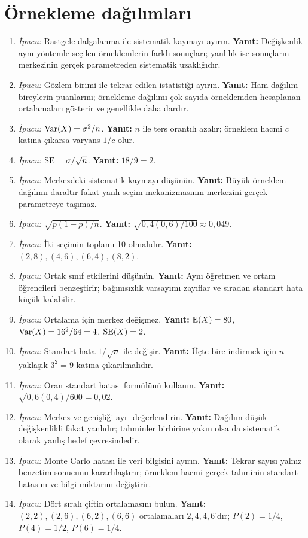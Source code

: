 \section{Örnekleme dağılımları}

\begin{enumerate}[leftmargin=*,itemsep=5pt]
\item \emph{İpucu:} Rastgele dalgalanma ile sistematik kaymayı ayırın.
\textbf{Yanıt:} Değişkenlik aynı yöntemle seçilen örneklemlerin farklı sonuçları;
yanlılık ise sonuçların merkezinin gerçek parametreden sistematik uzaklığıdır.
\item \emph{İpucu:} Gözlem birimi ile tekrar edilen istatistiği ayırın.
\textbf{Yanıt:} Ham dağılım bireylerin puanlarını; örnekleme dağılımı çok sayıda
örneklemden hesaplanan ortalamaları gösterir ve genellikle daha dardır.
\item \emph{İpucu:} $\operatorname{Var}(\bar X)=\sigma^2/n$. \textbf{Yanıt:} $n$ ile ters
orantılı azalır; örneklem hacmi $c$ katına çıkarsa varyans $1/c$ olur.
\item \emph{İpucu:} $\operatorname{SE}=\sigma/\sqrt n$. \textbf{Yanıt:} $18/9=2$.
\item \emph{İpucu:} Merkezdeki sistematik kaymayı düşünün.
\textbf{Yanıt:} Büyük örneklem dağılımı daraltır fakat yanlı seçim mekanizmasının
merkezini gerçek parametreye taşımaz.
\item \emph{İpucu:} $\sqrt{p(1-p)/n}$. \textbf{Yanıt:}
$\sqrt{0{,}4(0{,}6)/100}\approx0{,}049$.
\item \emph{İpucu:} İki seçimin toplamı 10 olmalıdır.
\textbf{Yanıt:} $(2,8),(4,6),(6,4),(8,2)$.
\item \emph{İpucu:} Ortak sınıf etkilerini düşünün.
\textbf{Yanıt:} Aynı öğretmen ve ortam öğrencileri benzeştirir; bağımsızlık
varsayımı zayıflar ve sıradan standart hata küçük kalabilir.
\item \emph{İpucu:} Ortalama için merkez değişmez.
\textbf{Yanıt:} $\mathbb{E}(\bar X)=80$, $\operatorname{Var}(\bar X)=16^2/64=4$,
$\operatorname{SE}(\bar X)=2$.
\item \emph{İpucu:} Standart hata $1/\sqrt n$ ile değişir.
\textbf{Yanıt:} Üçte bire indirmek için $n$ yaklaşık $3^2=9$ katına çıkarılmalıdır.
\item \emph{İpucu:} Oran standart hatası formülünü kullanın.
\textbf{Yanıt:} $\sqrt{0{,}6(0{,}4)/600}=0{,}02$.
\item \emph{İpucu:} Merkez ve genişliği ayrı değerlendirin.
\textbf{Yanıt:} Dağılım düşük değişkenlikli fakat yanlıdır; tahminler birbirine
yakın olsa da sistematik olarak yanlış hedef çevresindedir.
\item \emph{İpucu:} Monte Carlo hatası ile veri bilgisini ayırın.
\textbf{Yanıt:} Tekrar sayısı yalnız benzetim sonucunu kararlılaştırır;
örneklem hacmi gerçek tahminin standart hatasını ve bilgi miktarını değiştirir.
\item \emph{İpucu:} Dört sıralı çiftin ortalamasını bulun.
\textbf{Yanıt:} $(2,2),(2,6),(6,2),(6,6)$ ortalamaları $2,4,4,6$'dır;
$P(2)=1/4$, $P(4)=1/2$, $P(6)=1/4$.
\end{enumerate}

